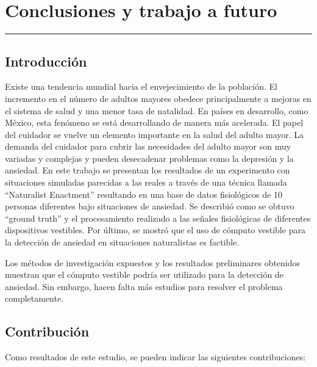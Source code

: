 
\chapter{Conclusiones y trabajo a futuro}\label{capit:cap5}
\vspace{-2.0325ex}%
\noindent
\rule{\textwidth}{0.5pt}
\vspace{-5.5ex}%
\newcommand{\pushline}{\Indp}%

\section{Introducci\'on}
	Existe una tendencia mundial hacia el envejecimiento de la población. El incremento en el n\'umero de adultos mayores obedece principalmente a mejoras en el sistema de salud y una menor tasa de natalidad. En países en desarrollo, como M\'exico, esta fenómeno se está desarrollando de manera más acelerada. El papel del cuidador se vuelve un elemento importante en la salud del adulto mayor. La demanda del cuidador para cubrir las necesidades del adulto mayor son muy variadas y complejas y pueden desecadenar problemas como la depresi\'on y la ansiedad.
En este trabajo se presentan los resultados de un experimento con situaciones simuladas parecidas a las reales a trav\'es de una t\'ecnica llamada ``Naturalist Enactment'' resultando en una base de datos fisiol\'ogicos de 10 personas diferentes bajo situaciones de ansiedad. Se describi\'o como se obtuvo ``ground truth'' y el procesamiento realizado a las se\~nales fisiol\'ogicas de diferentes dispositivos vestibles. Por \'ultimo, se mostr\'o que el uso de c\'omputo vestible para la detecci\'on de ansiedad en situaciones naturalistas es factible.

Los m\'etodos de investigaci\'on expuestos y los resultados preliminares obtenidos muestran que el c\'omputo vestible podr\'ia ser utilizado para la detecci\'on de ansiedad. Sin embargo, hacen falta m\'as estudios para resolver el problema completamente.


\section{Contribuci\'on}
	Como resultados de este estudio, se pueden indicar las siguientes contribuciones:

